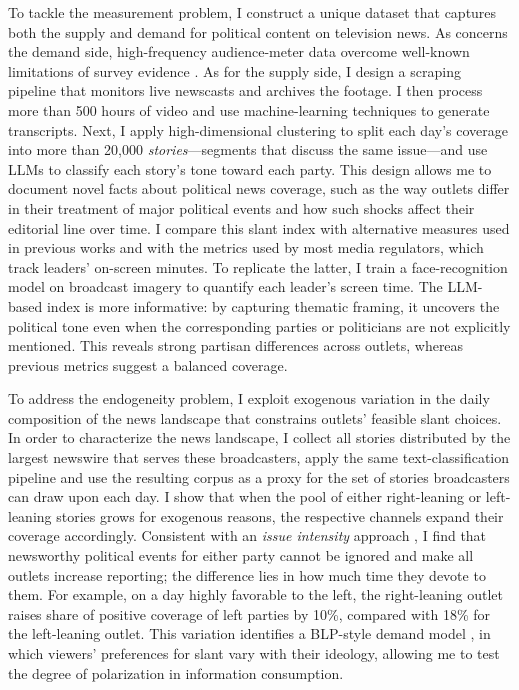 \documentclass[12pt]{article}
\begin{document}
To tackle the measurement problem, I construct a unique dataset that captures both the supply and demand for political content on television news. As concerns the demand side, high-frequency audience-meter data overcome well-known limitations of survey evidence \citep{prior}. As for the supply side, I design a scraping pipeline that monitors live newscasts and archives the footage. I then process more than 500 hours of video and use machine-learning techniques to generate transcripts. Next, I apply high-dimensional clustering to split each day’s coverage into more than 20,000 \emph{stories}—segments that discuss the same issue—and use LLMs to classify each story’s tone toward each party.  This design allows me to document novel facts about political news coverage, such as the way outlets differ in their treatment of major political events and how such shocks affect their editorial line over time. I compare this slant index with alternative measures used in previous works and with the metrics used by most media regulators, which track leaders’ on-screen minutes. To replicate the latter, I train a face-recognition model on broadcast imagery to quantify each leader’s screen time. The LLM-based index is more informative: by capturing thematic framing, it uncovers the political tone even when  the corresponding parties or politicians are not explicitly mentioned. This reveals strong partisan differences across outlets, whereas previous metrics suggest a balanced coverage.





To address the endogeneity problem, I exploit exogenous variation in the daily composition of the news landscape that  constrains outlets’ feasible slant choices. In order to characterize the news landscape, I collect all stories distributed by the largest newswire that serves these broadcasters, apply the same text-classification pipeline and use the resulting corpus as  a proxy for the set of stories broadcasters can draw upon each day. I show that  when the pool of either right-leaning or left-leaning  stories grows for exogenous reasons, the respective channels expand  their coverage accordingly. Consistent with an \emph{issue intensity} approach \citep{puglisi_review}, I find that newsworthy political events for either party cannot be ignored and make all outlets increase reporting; the difference lies in how much time they devote to them. For example, on a day highly favorable to the left, the right-leaning outlet raises share of positive coverage of left parties by 10\%, compared with 18\% for the left-leaning outlet. This variation identifies a BLP-style demand model \citep{berry_blp}, in which viewers’ preferences for slant vary with their ideology, allowing me to test the degree of polarization in information consumption. 
\end{document}

